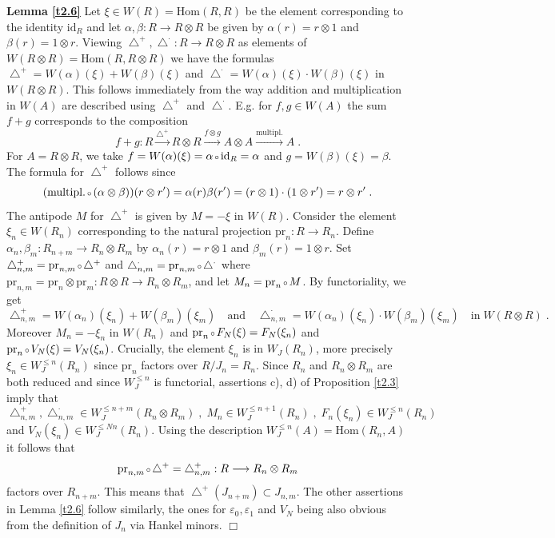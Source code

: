 \documentclass[12pt,leqno]{article}
\newcommand{\id}{\mathrm{id}}
\newcommand{\Hom}{\mathrm{Hom}}
\newcommand{\btu}{\bigtriangleup}
\newenvironment{proofof}{\noindent {\bf Proof of}}{\mbox{}\hspace*{\fill}$\Box$}
\newcommand{\pr}{\mathrm{pr}}
\newcommand{\verk}{\mbox{\scriptsize $\,\circ\,$}}
\begin{document}
\begin{proofof} \textbf{Lemma \ref{t2.6}}
Let $\xi \in W (R) = \Hom (R,R)$ be the element corresponding to the identity $\id_R$ and let $\alpha , \beta : R \to R \otimes R$ be given by $\alpha (r) = r \otimes 1$ and $\beta (r) = 1 \otimes r$. Viewing $\btu^+ , \btu^{\cdot} : R \to R \otimes R$ as elements of $W (R \otimes R) = \Hom (R , R \otimes R)$ we have the formulas $\btu^+ = W (\alpha) (\xi) + W (\beta) (\xi)$ and $\btu^{\cdot} = W (\alpha) (\xi) \cdot W (\beta) (\xi)$ in $W (R \otimes R)$. This follows immediately from the way addition and multiplication in $W (A)$ are described using $\btu^+$ and $\btu^{\cdot}$. E.g. for $f,g \in W (A)$ the sum $f+g$ corresponds to the composition
\[
f + g : R \xrightarrow{\btu^+} R \otimes R \xrightarrow{f \otimes g} A \otimes A \xrightarrow{\text{multipl.}} A \; .
\]
For $A = R \otimes R$, we take $f = W (\alpha) (\xi) = \alpha \verk \id_R = \alpha$ and $g = W (\beta) (\xi) = \beta$. The formula for $\btu^+$ follows since
\[
(\text{multipl.} \verk (\alpha \otimes \beta)) (r \otimes r') = \alpha (r) \beta (r') = (r \otimes 1) \cdot (1 \otimes r') = r \otimes r' \; .
\]
The antipode $M$ for $\btu^+$ is given by $M = - \xi$ in $W (R)$. Consider the element $\xi_n \in W (R_n)$ corresponding to the natural projection $\pr_n : R \to R_n$. Define $\alpha_n , \beta_m : R_{n+m} \to R_n \otimes R_m$ by $\alpha_n (r) = r \otimes 1$ and $\beta_m (r) = 1 \otimes r$. Set $\btu^+_{n,m} = \pr_{n,m} \verk \btu^+$ and $\btu^{\cdot}_{n,m} = \pr_{n,m} \verk \btu^{\cdot}$ where $\pr_{n,m} = \pr_n \otimes \pr_m : R \otimes R \to R_n \otimes R_m$, and let $M_n = \pr_n \verk M$. By functoriality, we get
\[
\btu^+_{n,m} = W (\alpha_n) (\xi_n) + W (\beta_m) (\xi_m) \quad \text{and} \quad \btu^{\cdot}_{n,m} = W (\alpha_n) (\xi_n) \cdot W (\beta_m) (\xi_m) \quad \text{in} \; W (R \otimes R) \; .
\]
Moreover $M_n = - \xi_n$ in $W (R_n)$ and $\pr_n \verk F_N (\xi) = F_N (\xi_n)$ and $\pr_n \verk V_N (\xi) = V_N (\xi_n)$. Crucially, the element $\xi_n$ is in $W_J (R_n)$, more precisely $\xi_n \in W^{\le n}_J (R_n)$ since $\pr_n$ factors over $R / J_n = R_n$. Since $R_n$ and $R_n \otimes R_m$ are both reduced and since $W^{\le n}_J$ is functorial, assertions c), d) of Proposition \ref{t2.3} imply that
\[
\btu^+_{n,m} , \btu^{\cdot}_{n,m} \in W^{\le n+m}_J (R_n \otimes R_m) \; , \; M_n \in W^{\le n+1}_J (R_n) \; , \; F_n (\xi_n) \in W^{\le n}_J (R_n) 
\]
and $V_N (\xi_n) \in W^{\le Nn}_J (R_n)$. Using the description $W^{\le n}_J (A) = \Hom (R_n , A)$ it follows that
\[
\pr_{n,m} \verk \btu^+ = \btu^+_{n,m} : R \longrightarrow R_n \otimes R_m
\]
factors over $R_{n+m}$. This means that $\btu^+ (J_{n+m}) \subset J_{n,m}$. The other assertions in Lemma \ref{t2.6} follow similarly, the ones for $\varepsilon_0 , \varepsilon_1$ and $V_N$ being also obvious from the definition of $J_n$ via Hankel minors.
\end{proofof}
\end{document}
